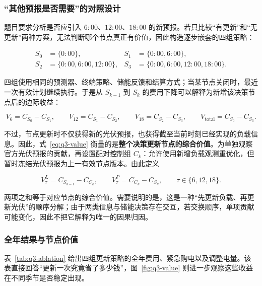 \subsubsection{“其他预报是否需要”的对照设计}

题目要求分析是否应引入 $6{:}00$、$12{:}00$、$18{:}00$ 的新预报。若只比较“有更新”和“无更新”两种方案，无法判断哪个节点真正有价值，因此构造逐步嵌套的四组策略：

\begin{equation}
    \begin{aligned}
        S_0&=\{0{:}00\}, & S_1&=\{0{:}00,6{:}00\},\\
        S_2&=\{0{:}00,6{:}00,12{:}00\}, &
        S_3&=\{0{:}00,6{:}00,12{:}00,18{:}00\}.
    \end{aligned}
    \label{eq:q3-nodes}
\end{equation}

四组使用相同的预测器、终端策略、储能反馈和结算方式；当某节点关闭时，最近一次有效计划继续执行。于是从 $S_{k-1}$ 到 $S_k$ 的费用下降可以解释为新增该决策节点后的边际收益：

\begin{equation}
    V_6=C_{S_0}-C_{S_1},\qquad
    V_{12}=C_{S_1}-C_{S_2},\qquad
    V_{18}=C_{S_2}-C_{S_3},\qquad
    V_{\text{total}}=C_{S_0}-C_{S_3}.
    \label{eq:q3-value}
\end{equation}

不过，节点更新时不仅获得新的光伏预报，也获得截至当前时刻已经实现的负载信息。因此，式~\eqref{eq:q3-value} 衡量的是\textbf{整个决策更新节点的综合价值}。为单独观察官方光伏预报的贡献，再设置配对控制组 $C_k$：允许使用新增负载观测重优化，但暂时冻结光伏预报为上一有效节点版本。由此定义

\begin{equation}
    V^L_{\tau}=C_{S_{k-1}}-C_{C_k},\qquad
    V^P_{\tau}=C_{C_k}-C_{S_k},\qquad \tau\in\{6,12,18\}.
    \label{eq:q3-paired-value}
\end{equation}

两项之和等于对应节点的综合价值。需要说明的是，这是一种“先更新负载、再更新光伏”的顺序分解；由于两类信息与储能决策存在交互，若交换顺序，单项贡献可能变化，因此不把它解释为唯一的因果归因。

\subsubsection{全年结果与节点价值}

表~\ref{tab:q3-ablation} 给出四组更新策略的全年费用、紧急购电以及调整电量。该表直接回答“更新一次究竟省了多少钱”，图~\ref{fig:q3-value} 则进一步观察这些收益在不同季节是否稳定出现。

